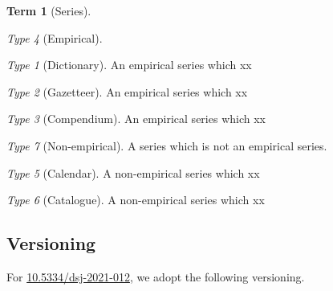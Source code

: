 \documentclass{amsart}%
\theoremstyle{plain}
\theoremstyle{definition}
\theoremstyle{remark}
\theoremstyle{definition}
\newtheorem{term}{Term}[subsection]%
\theoremstyle{remark}
\newtheorem*{term-type}{Type}
\begin{document}
\begin{term}[Series]
\begin{term-type}[Empirical]
\begin{term-type}[Dictionary]
An empirical series which xx
\end{term-type}%
\begin{term-type}[Gazetteer]
An empirical series which xx
\end{term-type}%
\begin{term-type}[Compendium]
An empirical series which xx
\end{term-type}%
\end{term-type}%
\begin{term-type}[Non-empirical]
A series which is not an empirical series.
\begin{term-type}[Calendar]
A non-empirical series which xx
\end{term-type}%
\begin{term-type}[Catalogue]
A non-empirical series which xx
\end{term-type}%
\end{term-type}%
\end{term}
%
%
%
%
%
\subsection{Versioning}
\label{ss:versioning}
For \href{https://doi.org/10.5334/dsj-2021-012}{10.5334/dsj-2021-012}, we adopt the following versioning.
%
%
%
%
%
\end{document}
